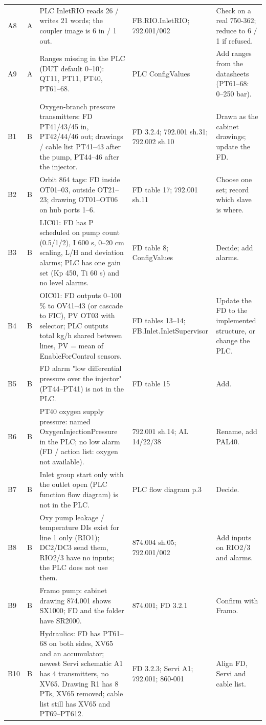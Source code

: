{{\begin{tabular}{@{}p{8mm}p{4mm}p{120mm}p{100mm}p{90mm}@{}}
      A8 & A & PLC InletRIO reads 26 / writes 21 words; the coupler image is 6 in / 1 out. & FB.RIO.InletRIO; 792.001/002 & Check on a real 750-362; reduce to 6 / 1 if refused. \\
      A9 & A & Ranges missing in the PLC (DUT default 0--10): QT11, PT11, PT40, PT61--68. & PLC ConfigValues & Add ranges from the datasheets (PT61--68: 0--250 bar). \\
      \midrule
      B1 & B & Oxygen-branch pressure transmitters: FD PT41/43/45 in, PT42/44/46 out; drawings / cable list PT41--43 after the pump, PT44--46 after the injector. & FD 3.2.4; 792.001 sh.31; 792.002 sh.10 & Drawn as the cabinet drawings; update the FD. \\
      B2 & B & Orbit 864 tags: FD inside OT01--03, outside OT21--23; drawing OT01--OT06 on hub ports 1--6. & FD table 17; 792.001 sh.11 & Choose one set; record which slave is where. \\
      B3 & B & LIC01: FD has P scheduled on pump count (0.5/1/2), I 600 s, 0--20 cm scaling, L/H and deviation alarms; PLC has one gain set (Kp 450, Ti 60 s) and no level alarms. & FD table 8; ConfigValues & Decide; add alarms. \\
      B4 & B & OIC01: FD outputs 0--100 \% to OV41--43 (or cascade to FIC), PV OT03 with selector; PLC outputs total kg/h shared between lines, PV = mean of EnableForControl sensors. & FD tables 13--14; FB.Inlet.InletSupervisor & Update the FD to the implemented structure, or change the PLC. \\
      B5 & B & FD alarm "low differential pressure over the injector" (PT44--PT41) is not in the PLC. & FD table 15 & Add. \\
      B6 & B & PT40 oxygen supply pressure: named OxygenInjectionPressure in the PLC; no low alarm (FD / action list: oxygen not available). & 792.001 sh.14; AL 14/22/38 & Rename, add PAL40. \\
      B7 & B & Inlet group start only with the outlet open (PLC function flow diagram) is not in the PLC. & PLC flow diagram p.3 & Decide. \\
      B8 & B & Oxy pump leakage / temperature DIs exist for line 1 only (RIO1); DC2/DC3 send them, RIO2/3 have no inputs; the PLC does not use them. & 874.004 sh.05; 792.001/002 & Add inputs on RIO2/3 and alarms. \\
      B9 & B & Framo pump: cabinet drawing 874.001 shows SX1000; FD and the folder have SR2000. & 874.001; FD 3.2.1 & Confirm with Framo. \\
      B10 & B & Hydraulics: FD has PT61--68 on both sides, XV65 and an accumulator; newest Servi schematic A1 has 4 transmitters, no XV65. Drawing R1 has 8 PTs, XV65 removed; cable list still has XV65 and PT69--PT612. & FD 3.2.3; Servi A1; 792.001; 860-001 & Align FD, Servi and cable list. \\

\end{tabular}}}
